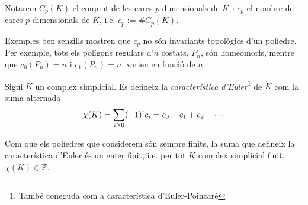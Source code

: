 \documentclass[../main.tex]{subfiles}
\begin{document}
\begin{defi}
 Notarem $C_p(K)$ el conjunt de les cares $p$-dimensionals de $K$ i $c_p$ el nombre de cares $p$-dimensionals de $K$, i.e. $c_p:=\#C_p(K)$. 
\end{defi}

Exemples ben senzills mostren que $c_p$ no són invariants topològics d'un políedre. Per exemple, tots els polígons regulars d'$n$ costats, $P_n$, són homeomorfs, mentre que $c_0(P_n) = n$ i $c_1(P_n) = n$, varien en funció de $n$.

\begin{defi}
 Sigui $K$ un complex simplicial. Es defineix la \textit{característica d'Euler}\footnote{També coneguda com a característica d'Euler-Poincaré} de $K$ com la suma alternada
\begin{equation}
    \notag
    \chi(K) = \sum_{i\geq 0}(-1)^{i}c_i = c_0-c_1+c_2-\cdots
\end{equation}
\end{defi}

Com que els políedres que considerem són sempre finits, la suma que defineix la característica d'Euler és un enter finit, i.e. per tot $K$ complex simplicial finit, $\chi(K)\in\mathbb{Z}$.
\end{document}
